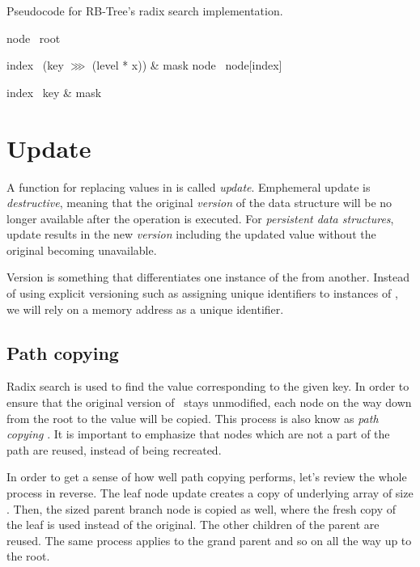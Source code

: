 \begin{listing}[ht!]
    \caption{Pseudocode for RB-Tree's radix search implementation.}
    \label{lst:rb-tree-radix-search}

    \begin{algorithmic}
            \State node \la\ root

                \State index \la\ (key $\ggg$ (level * x)) \& mask
                \State node \la\ node[index]
            \EndFor

            \State index \la\ key \& mask
            \State {}
        \EndFunction
    \end{algorithmic}
\end{listing}

\section{Update}
A function for replacing values in \rbtree{} is called \emph{update}. Emphemeral update is \emph{destructive}, meaning that the original \emph{version} of the data structure will be no longer available after the operation is executed. For \emph{persistent data structures}, update results in the new \emph{version} including the updated value without the original becoming unavailable.

Version is something that differentiates one instance of the \rbtree{} from another. Instead of using explicit versioning such as assigning unique identifiers to instances of \rbtree{}, we will rely on a memory address as a unique identifier.

\subsection*{Path copying}
Radix search is used to find the value corresponding to the given key. In order to ensure that the original version of \rbtree\ stays unmodified, each node on the way down from the root to the value will be copied. This process is also know as \emph{path copying} \cite{planar-point-location}. It is important to emphasize that nodes which are not a part of the path are reused, instead of being recreated.

In order to get a sense of how well path copying performs, let’s review the whole process in reverse. The leaf node update creates a copy of underlying array of size \m{}. Then, the \m{} sized parent branch node is copied as well, where the fresh copy of the leaf is used instead of the original. The other children of the parent are reused. The same process applies to the grand parent and so on all the way up to the root.

